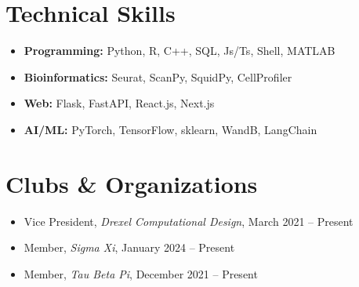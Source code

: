 \documentclass[letterpaper,11pt]{article}
\begin{document}
\section{Technical Skills}
\begin{multicols}{2}
    \begin{itemize}[leftmargin=0.1in, itemsep=-3pt, label={}]
        \item\small {
            \textbf{Programming:} {Python, R, C++, SQL, Js/Ts, Shell, MATLAB} \\
        }
        \item\small {
            \textbf{Bioinformatics:} {Seurat, ScanPy, SquidPy, CellProfiler}
        }
    \end{itemize}
    
    \columnbreak
    
    \begin{itemize}[leftmargin=0.1in, itemsep=-3pt, label={}]
        \item\small {
            \textbf{Web:} {Flask, FastAPI, React.js, Next.js}
        }
        \item\small {
            \textbf{AI/ML:} {PyTorch, TensorFlow, sklearn, WandB, LangChain}
        }
    \end{itemize}
\end{multicols}
 \vspace{-6pt}
   
\section{Clubs \& Organizations}
\begin{itemize}[leftmargin=0.2in, itemsep=-4pt]
    \item\small Vice President, \emph{Drexel Computational Design}, March 2021 -- Present
    \item\small Member, \emph{Sigma Xi}, January 2024 -- Present
    \item\small Member, \emph{Tau Beta Pi}, December 2021 -- Present
\end{itemize}
 
\end{document}
